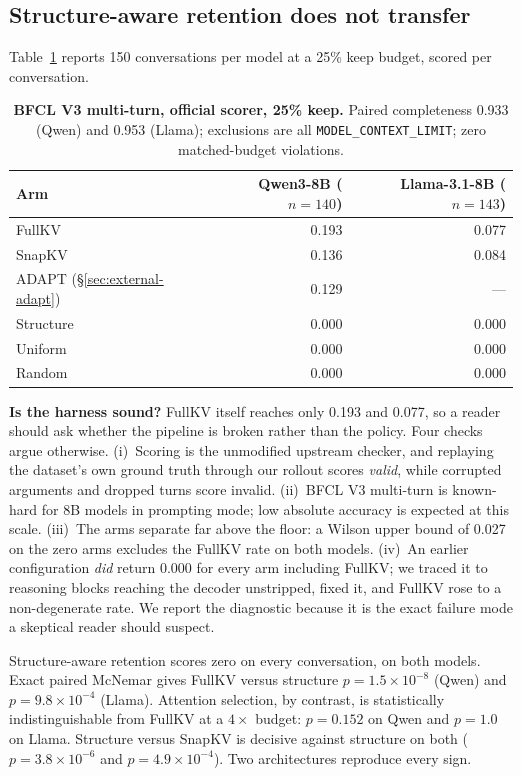 \documentclass[10pt]{article}
\begin{document}
\subsection{Structure-aware retention does not transfer}
\label{sec:external-transfer}

Table~\ref{tab:external-arms} reports 150 conversations per model at a 25\% keep
budget, scored per conversation.

\begin{table}[!htbp]
  \centering
  \caption{\textbf{BFCL V3 multi-turn, official scorer, 25\% keep.}  Paired
  completeness 0.933 (Qwen) and 0.953 (Llama); exclusions are all
  \texttt{MODEL\_CONTEXT\_LIMIT}; zero matched-budget violations.}
  \label{tab:external-arms}
  \begin{tabular}{lrr}
    \toprule
    Arm & Qwen3-8B ($n{=}140$) & Llama-3.1-8B ($n{=}143$) \\
    \midrule
    FullKV            & 0.193 & 0.077 \\
    SnapKV            & 0.136 & 0.084 \\
    ADAPT (\S\ref{sec:external-adapt}) & 0.129 & --- \\
    Structure         & 0.000 & 0.000 \\
    Uniform           & 0.000 & 0.000 \\
    Random            & 0.000 & 0.000 \\
    \bottomrule
  \end{tabular}
\end{table}

\textbf{Is the harness sound?}  FullKV itself reaches only 0.193 and 0.077, so a
reader should ask whether the pipeline is broken rather than the policy.  Four
checks argue otherwise.  (i)~Scoring is the unmodified upstream checker, and
replaying the dataset's own ground truth through our rollout scores \emph{valid},
while corrupted arguments and dropped turns score invalid.  (ii)~BFCL V3
multi-turn is known-hard for 8B models in prompting mode; low absolute accuracy
is expected at this scale.  (iii)~The arms separate far above the floor: a Wilson
upper bound of 0.027 on the zero arms excludes the FullKV rate on both models.
(iv)~An earlier configuration \emph{did} return 0.000 for every arm including
FullKV; we traced it to reasoning blocks reaching the decoder unstripped, fixed
it, and FullKV rose to a non-degenerate rate.  We report the diagnostic because
it is the exact failure mode a skeptical reader should suspect.

Structure-aware retention scores zero on every conversation, on both models.
Exact paired McNemar gives FullKV versus structure $p=1.5\times10^{-8}$ (Qwen)
and $p=9.8\times10^{-4}$ (Llama).  Attention selection, by contrast, is
statistically indistinguishable from FullKV at a $4\times$ budget: $p=0.152$ on
Qwen and $p=1.0$ on Llama.  Structure versus SnapKV is decisive against
structure on both ($p=3.8\times10^{-6}$ and $p=4.9\times10^{-4}$).  Two
architectures reproduce every sign.
\end{document}
